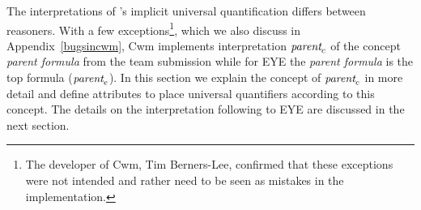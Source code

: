 The interpretations of \nthree's implicit universal quantification differs between reasoners. 
With a few exceptions\footnote{The developer of Cwm, Tim Berners-Lee, confirmed that these exceptions were not intended
and rather need to be seen as mistakes in the implementation.}, which we also discuss in Appendix~\ref{bugsincwm}, 
Cwm implements interpretation $\emph{parent}_c$ %
of the 
concept \emph{parent formula} from the \wwwc team submission while 
for EYE the \emph{parent formula} is the top formula ($\emph{parent}_e$). In this section we explain the concept of $\emph{parent}_c$ in more detail
and define attributes to place universal quantifiers according to this concept. 
The details on the interpretation following to EYE are discussed in the next section.
%
% 
% 

%
%
%



